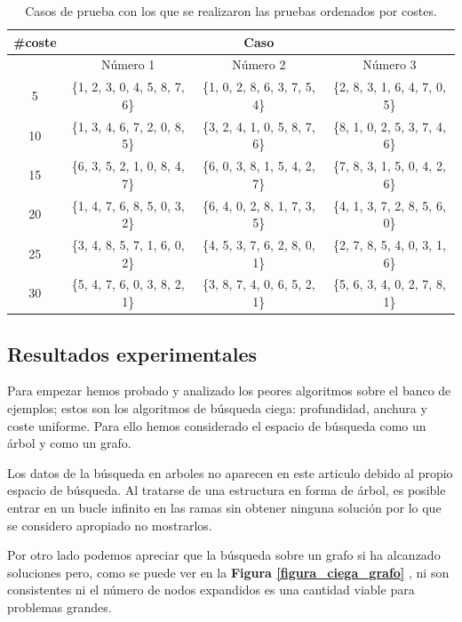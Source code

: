 \documentclass[runningheads]{llncs}
\begin{document}
\begin{table}[H]
\centering
\caption{Casos de prueba con los que se realizaron las pruebas ordenados por costes.}\label{tabla_banco_ejemplos}
{\renewcommand{\arraystretch}{1.8}
\begin{tabular}{|c|c|c|c|}
\hline
\#coste &  \multicolumn{3}{|c|}{Caso}\\
\hline
  & Número 1 & Número 2 & Número 3\\
\hline\hline
5 & \{1, 2, 3, 0, 4, 5, 8, 7, 6\} & \{1, 0, 2, 8, 6, 3, 7, 5, 4\} & \{2, 8, 3, 1, 6, 4, 7, 0, 5\}\\
\hline
10 & \{1, 3, 4, 6, 7, 2, 0, 8, 5\} & \{3, 2, 4, 1, 0, 5, 8, 7, 6\} & \{8, 1, 0, 2, 5, 3, 7, 4, 6\}\\
\hline 
15 & \{6, 3, 5, 2, 1, 0, 8, 4, 7\} & \{6, 0, 3, 8, 1, 5, 4, 2, 7\} & \{7, 8, 3, 1, 5, 0, 4, 2, 6\}\\
\hline 
20 & \{1, 4, 7, 6, 8, 5, 0, 3, 2\} & \{6, 4, 0, 2, 8, 1, 7, 3, 5\} & \{4, 1, 3, 7, 2, 8, 5, 6, 0\}\\
\hline 
25 & \{3, 4, 8, 5, 7, 1, 6, 0, 2\} & \{4, 5, 3, 7, 6, 2, 8, 0, 1\} & \{2, 7, 8, 5, 4, 0, 3, 1, 6\}\\
\hline 
30 & \{5, 4, 7, 6, 0, 3, 8, 2, 1\} & \{3, 8, 7, 4, 0, 6, 5, 2, 1\} & \{5, 6, 3, 4, 0, 2, 7, 8, 1\}\\
\hline
\end{tabular}
}
\end{table}

\subsection{Resultados experimentales}

Para empezar hemos probado y analizado los peores algoritmos sobre el banco de ejemplos; estos son los algoritmos de búsqueda ciega: profundidad, anchura y coste uniforme. Para ello hemos considerado el espacio de búsqueda como un árbol y como un grafo. 

Los datos de la búsqueda en arboles no aparecen en este articulo debido al propio espacio de búsqueda. Al tratarse de una estructura en forma de árbol, es posible entrar en un bucle infinito en las ramas sin obtener ninguna solución por lo que se considero apropiado no mostrarlos.

Por otro lado podemos apreciar que la búsqueda sobre un grafo si ha alcanzado soluciones pero, como se puede ver en la \textbf{Figura \ref{figura_ciega_grafo}} , ni son consistentes ni el número de nodos expandidos es una cantidad viable para problemas grandes.
\end{document}
